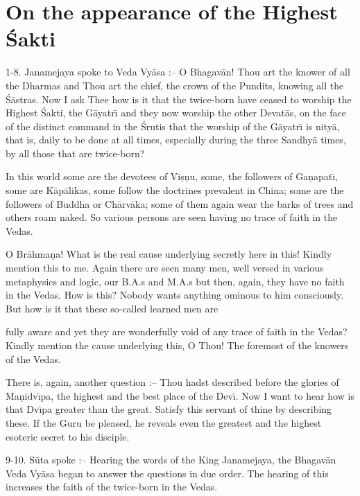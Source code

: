 \chapter{On the appearance of the Highest \'Sakti}

1-8. Janamejaya spoke to Veda Vy\=asa :-- O Bhagav\=an! Thou art the knower of all the Dharmas and Thou art the chief, the crown of the Pundits, knowing all the \'S\=astras. Now I ask Thee how is it that the twice-born have ceased to worship the Highest \'Sakti, the G\=ayatr\={\i} and they now worship the other Devat\=as, on the face of the distinct command in the \'Srutis that the worship of the G\=ayatr\={\i} is nity\=a, that is, daily to be done at all times, especially during the three Sandhy\=a times, by all those that are twice-born?

In this world some are the devotees of Vi\d{s}\d{n}u, some, the followers of Ga\d{n}apat\={\i}, some are K\=ap\=alikas, some follow the doctrines prevalent in China; some are the followers of Buddha or Ch\=arv\=aka; some of them again wear the barks of trees and others roam naked. So various persons are seen having no trace of faith in the Vedas.

O Br\=ahma\d{n}a! What is the real cause underlying secretly here in this! Kindly mention this to me. Again there are seen many men, well versed in various metaphysics and logic, our B.A.s and M.A.s but then, again, they have no faith in the Vedas. How is this? Nobody wants anything ominous to him consciously. But how is it that these so-called learned men are

fully aware and yet they are wonderfully void of any trace of faith in the Vedas? Kindly mention the cause underlying this, O Thou! The foremost of the knowers of the Vedas.

There is, again, another question :-- Thou hadst described before the glories of Ma\d{n}idv\={\i}pa, the highest and the best place of the Dev\={\i}. Now I want to hear how is that Dv\={\i}pa greater than the great. Satisfy this servant of thine by describing these. If the Guru be pleased, he reveals even the greatest and the highest esoteric secret to his disciple.

9-10. S\=uta spoke :-- Hearing the words of the King Janamejaya, the Bhagav\=an Veda Vy\=asa began to answer the questions in due order. The hearing of this increases the faith of the twice-born in the Vedas.

